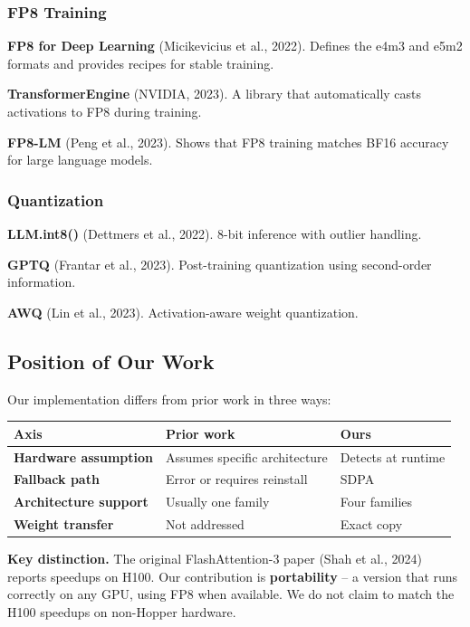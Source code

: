 \subsubsection{FP8 Training}

\textbf{FP8 for Deep Learning} (Micikevicius et al., 2022). Defines the e4m3 and 
e5m2 formats and provides recipes for stable training.

\textbf{TransformerEngine} (NVIDIA, 2023). A library that automatically casts 
activations to FP8 during training.

\textbf{FP8-LM} (Peng et al., 2023). Shows that FP8 training matches BF16 
accuracy for large language models.

\subsubsection{Quantization}

\textbf{LLM.int8()} (Dettmers et al., 2022). 8-bit inference with outlier handling.

\textbf{GPTQ} (Frantar et al., 2023). Post-training quantization using second-order 
information.

\textbf{AWQ} (Lin et al., 2023). Activation-aware weight quantization.

\subsection{Position of Our Work}

Our implementation differs from prior work in three ways:

\begin{table}[H]
\centering
\small
\begin{tabular}{lll}
\toprule
\textbf{Axis} & \textbf{Prior work} & \textbf{Ours} \\
\midrule
\textbf{Hardware assumption} & Assumes specific architecture & Detects at runtime \\
\textbf{Fallback path} & Error or requires reinstall & SDPA \\
\textbf{Architecture support} & Usually one family & Four families \\
\textbf{Weight transfer} & Not addressed & Exact copy \\
\bottomrule
\end{tabular}
\end{table}

\textbf{Key distinction.} The original FlashAttention-3 paper (Shah et al., 2024) 
reports speedups on H100. Our contribution is \textbf{portability} -- a version 
that runs correctly on any GPU, using FP8 when available. We do not claim 
to match the H100 speedups on non-Hopper hardware.



